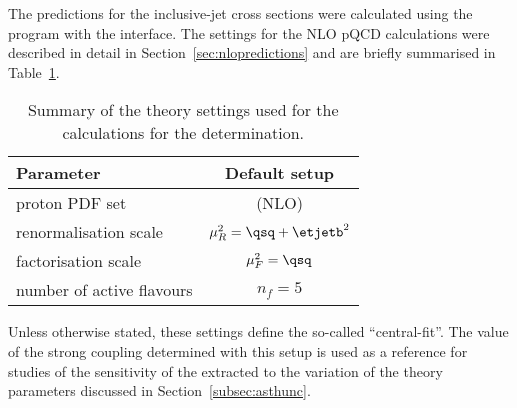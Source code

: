 The predictions for the inclusive-jet cross sections were calculated using the \nlojet program with the \fastnlo interface. The settings for the NLO pQCD calculations were described in detail in Section~\ref{sec:nlopredictions} and are briefly summarised in Table~\ref{tab:nlosettings}.
\begin{table}[h]
\centering
\begin{tabular}{l|c}
Parameter  & Default setup \\ 
\hline \hline proton PDF set & \herapdf1.5 (NLO) \T\B\\
\hline renormalisation scale & $\mu_R^2=\qsq + \etjetb^2$ \T\B\\ 
\hline factorisation scale          & $\mu_F^2=\qsq $ \T\B\\ 
\hline number of active flavours    & $n_f = 5 $ \T\B\\ 
\end{tabular} 
\caption{Summary of the theory settings used for the calculations for the \as determination.}
\label{tab:nlosettings}
\end{table}
Unless otherwise stated, these settings define the so-called ``central-fit''. The value of the strong coupling determined with this setup is used as a reference for studies of the sensitivity of the extracted \asz to the variation of the theory parameters discussed in Section~\ref{subsec:asthunc}.

